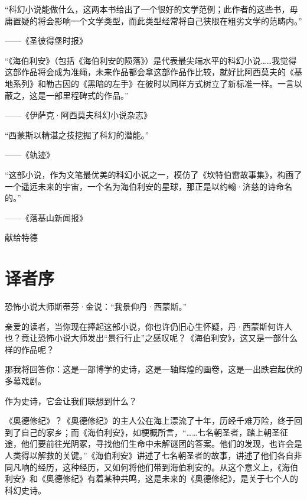 \documentclass[AutoFakeBold=true]{book}
\begin{document}
``科幻小说能做什么，这两本书给出了一个很好的文学范例；此作者的这些书，毋庸置疑的将会影响一个文学类型，而此类型经常将自己狭限在粗劣文学的范畴内。''\begin{flushright}——《圣彼得堡时报》\end{flushright}

``《海伯利安》（包括《海伯利安的陨落》）是代表最尖端水平的科幻小说……我觉得这部作品将会成为准绳，未来作品都会拿这部作品作比较，就好比阿西莫夫的《基地系列》和勒古因的《黑暗的左手》在彼时以同样方式树立了新标准一样。一言以蔽之，这是一部里程碑式的作品。''\begin{flushright}——《伊萨克·阿西莫夫科幻小说杂志》\end{flushright}

``西蒙斯以精湛之技挖掘了科幻的潜能。''\begin{flushright}——《轨迹》\end{flushright}

``这部小说，作为文笔最优美的科幻小说之一，模仿了《坎特伯雷故事集》，构画了一个遥远未来的宇宙，一个名为海伯利安的星球，那正是以约翰·济慈的诗命名的。''\begin{flushright}——《落基山新闻报》\end{flushright}

\newpage
\vspace*{\fill}
\begin{center}
	献给特德
\end{center}
\vspace*{\fill}

\newpage
\pagestyle{plain}
\tableofcontents

\newpage
\pagestyle{headings}

\setcounter{chapter}{-2}

\chapter{译者序}

恐怖小说大师斯蒂芬·金说：``我景仰丹·西蒙斯。''

亲爱的读者，当你现在捧起这部小说，你也许仍旧心生怀疑，丹·西蒙斯何许人也？竟让恐怖小说大师发出``景行行止''之感叹呢？《海伯利安》，这又是一部什么样的作品呢？

那我将回答你：这是一部博学的史诗，这是一轴辉煌的画卷，这是一出跌宕起伏的多幕戏剧。

作为史诗，它会让我们联想到什么？

《奥德修纪》？《奥德修纪》的主人公在海上漂流了十年，历经千难万险，终于回到了自己的家乡；而《海伯利安》，如梗概所言，``……七名朝圣者，踏上朝圣征途，他们要前往光阴冢，寻找他们生命中未解谜团的答案。他们的发现，也许会是人类得以解救的关键。''《海伯利安》讲述了七名朝圣者的故事，讲述了他们各自非同凡响的经历，这种经历，又如何将他们带到海伯利安的。从这个意义上，《海伯利安》和《奥德修纪》有着某种共鸣，这是未来的《奥德修纪》，是关于七个人的科幻史诗。
\end{document}

